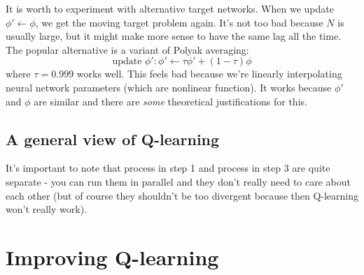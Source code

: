 \documentclass{report}
\begin{document}
It is worth to experiment with alternative target networks.
When we update $\phi' \leftarrow \phi$, we get the moving target problem again.
It's not too bad because $N$ is usually large, but it might make
more sense to have the same lag all the time.
The popular alternative is a variant of Polyak averaging:
\begin{equation}
		\text{update } \phi' : \phi' \leftarrow \tau \phi' + (1 - \tau) \phi
\end{equation}
where $\tau = 0.999$ works well.
This feels bad because we're linearly interpolating neural network parameters (which are nonlinear function).
It works because $\phi'$ and $\phi$ are similar and there are \textit{some} theoretical justifications for this.

\subsection{A general view of Q-learning}

It's important to note that process in step 1 and process in step 3 are quite separate - you can run them in parallel and they
don't really need to care about each other (but of course they shouldn't be too divergent because then Q-learning won't really work).

\section{Improving Q-learning}
\end{document}
